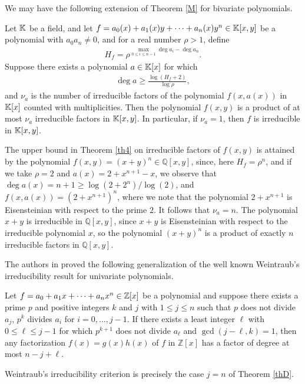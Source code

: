 \documentclass[12pt,reqno]{amsart}%
\begin{document}
We may have the following extension of Theorem \ref{M} for bivariate polynomials.
\begin{theorem}\label{th4}
 Let $\mathbb{K}$ be a field, and let $f=a_0(x)+a_1(x)y+\cdots+a_n(x)y^n\in \mathbb{K}[x,y]$ be a  polynomial with $a_0a_n\neq 0$, and for a real number $\rho>1$, define
 \begin{eqnarray*}
 H_f=\rho^{\max_{0\leq i\leq n-1}\deg a_i-\deg a_n}.
 \end{eqnarray*}
  Suppose there exists a polynomial $a\in \mathbb{K}[x]$ for which
 \begin{eqnarray*}
              \deg a\geq  \frac{\log(H_f+2)}{\log \rho},
 \end{eqnarray*}
  and $\nu_a$ is the number of irreducible factors of the polynomial $f(x,a(x))$ in $\mathbb{K}[x]$ counted with multiplicities. Then  the polynomial $f(x,y)$ is a product of at most $\nu_a$ irreducible factors in $\mathbb{K}[x,y]$. In particular, if $\nu_a=1$, then $f$ is irreducible in $\mathbb{K}[x,y]$.
\end{theorem}
The upper bound in Theorem \ref{th4} on irreducible factors of $f(x,y)$ is attained by the polynomial $f(x,y)=(x+y)^n\in \mathbb{Q}[x,y]$, since, here $H_f=\rho^n$, and if we take $\rho=2$ and $a(x)=2+x^{n+1}-x$, we observe that $\deg a(x)=n+1\geq \log(2+2^n)/\log(2)$, and $f(x,a(x))=(2+x^{n+1})^n$, where we note that the polynomial $2+x^{n+1}$ is Eisensteinian with respect to the prime $2$. It follows that $\nu_a=n$. The polynomial $x+y$ is irreducible in $\mathbb{Q}[x,y]$, since $x+y$ is Eisensteinian with respect to the irreducible polynomial $x$, so the polynomial $(x+y)^n$ is a product of exactly $n$ irreducible factors in $\mathbb{Q}[x,y]$.

 The authors in \cite{JRG2024}  proved the following generalization of the well known Weintraub's irreducibility result \cite{W} for univariate polynomials.
\begin{thmx}\label{thD}
        Let $f=a_0+ a_{1}x+\cdots+a_n x^n\in \Bbb{Z}[x]$ be a polynomial and suppose there exists a prime  $p$ and   positive integers $k$ and $j$ with $1\leq j\leq n$ such that  $p$ does not divide $a_j$, $p^k$ divides $a_i$ for $i=0,\ldots,j-1$. If there exists a least integer $\ell$ with $0\leq \ell\leq j-1$ for which $p^{k+1}$ does not divide $a_\ell$ and $\gcd(j-\ell,k)=1$, then any factorization $f(x)=g(x)h(x)$ of $f$ in $\mathbb{Z}[x]$ has a factor of degree at most $n-j+\ell$.
\end{thmx}
Weintraub's irreducibility criterion is precisely the case $j=n$ of Theorem \ref{thD}.
\end{document}
